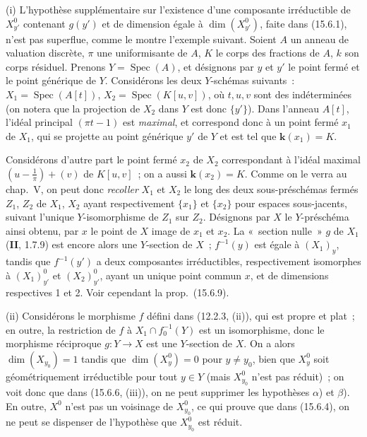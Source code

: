 \begin{remarks}[15.6.10]
\label{IV.15.6.10-fr}
(i) L'hypothèse supplémentaire sur l'existence d'une composante irréductible de $X_{y'}^0$ contenant $g(y')$ et de dimension égale à $\dim(X_{y'}^0)$, faite dans (15.6.1), n'est pas superflue, comme le montre l'exemple suivant. Soient $A$ un anneau de valuation discrète, $\pi$ une uniformisante de $A$, $K$ le corps des fractions de $A$, $k$ son corps résiduel. Prenons $Y=\operatorname{Spec}(A)$, et désignons par $y$ et $y'$ le point fermé et le point générique de $Y$. Considérons les deux $Y$-schémas suivants~: $X_1=\operatorname{Spec}(A[t])$, $X_2=\operatorname{Spec}(K[u,v])$, où $t,u,v$ sont des indéterminées (on notera que la projection de $X_2$ dans $Y$ est donc $\{y'\}$). Dans l'anneau $A[t]$, l'idéal principal $(\pi t-1)$ est \emph{maximal}, et correspond donc à un point fermé $x_1$ de $X_1$, qui se projette au point générique $y'$ de $Y$ et est tel que $\mathbf{k}(x_1)=K$.

Considérons d'autre part le point fermé $x_2$ de $X_2$ correspondant à l'idéal maximal $\left(u-\frac{1}{\pi}\right)+(v)$ de $K[u,v]$~; on a aussi $\mathbf{k}(x_2)=K$. Comme on le verra au chap.~V, on peut donc \emph{recoller} $X_1$ et $X_2$ le long des deux sous-préschémas fermés $Z_1$, $Z_2$ de $X_1$, $X_2$ ayant respectivement $\{x_1\}$ et $\{x_2\}$ pour espaces sous-jacents, suivant l'unique $Y$-isomorphisme de $Z_1$ sur $Z_2$. Désignons par $X$ le $Y$-préschéma ainsi obtenu, par $x$ le point de $X$ image de $x_1$ et $x_2$. La «~section nulle~» $g$ de $X_1$ (\textbf{II}, 1.7.9) est encore alors une $Y$-section de $X$~; $f^{-1}(y)$ est égale à $(X_1)_y$, tandis que $f^{-1}(y')$ a deux composantes irréductibles, respectivement isomorphes à $(X_1)_{y'}^0$ et $(X_2)_{y'}^0$, ayant un unique point commun $x$, et de dimensions respectives 1 et 2. Voir cependant la prop.~(15.6.9).

(ii) Considérons le morphisme $f$ défini dans (12.2.3, (ii)), qui est propre et plat~; en outre, la restriction de $f$ à $X_1\cap f_0^{-1}(Y)$ est un isomorphisme, donc le morphisme réciproque $g:Y\to X$ est une $Y$-section de $X$. On a alors $\dim(X_{y_0})=1$ tandis que $\dim(X_y^0)=0$ pour $y\ne y_0$, bien que $X_y^0$ soit géométriquement irréductible pour tout $y\in Y$ (mais $X_{y_0}^0$ n'est pas réduit)~; on voit donc que dans (15.6.6, (iii)), on ne peut supprimer les hypothèses $\alpha$) et $\beta$). En outre, $X^0$ n'est pas un voisinage de $X_{y_0}^{0}$, ce qui prouve que dans (15.6.4), on ne peut se dispenser de l'hypothèse que $X_{y_0}^0$ est réduit.


\end{remarks}
